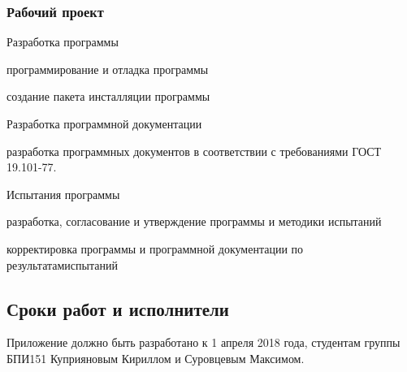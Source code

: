 \subsubsection{Рабочий проект}
\begin{my_enumerate}
	\item Разработка программы
		\begin{my_enumerate}
			\item	программирование и отладка программы
			\item 	создание пакета инсталляции программы			
		\end{my_enumerate}
	\item Разработка программной документации
		\begin{my_enumerate}
			\item разработка программных документов в соответствии с требованиями ГОСТ 19.101-77.
		\end{my_enumerate}
     \item Испытания программы
   		\begin{my_enumerate}
	     	\item разработка, согласование и утверждение программы и методики испытаний
			\item корректировка программы и программной документации по результатамиспытаний
	     \end{my_enumerate}
\end{my_enumerate}

\subsection{Сроки работ и исполнители}

Приложение должно быть разработано к 1 апреля 2018 года, студентам группы БПИ151 
Куприяновым Кириллом и Суровцевым Максимом.


